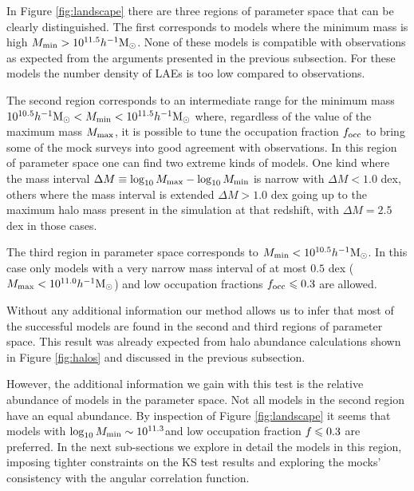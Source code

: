 \documentclass[usenatbib]{mn2e}
\newcommand{\hMsun}{{\ifmmode{h^{-1}{\rm
        {M_{\odot}}}}\else{$h^{-1}{\rm{M_{\odot}}}$}\fi}}
\begin{document}
{In Figure \ref{fig:landscape} there are three regions of parameter
space that can be clearly distinguished. The first corresponds to
models where the minimum mass is high $M_{\rm min}>
10^{11.5}\hMsun$. None of these models is compatible with observations
as expected from the arguments presented in the previous
subsection. For these models the number density of LAEs is too low
compared to observations.

 
The second region corresponds to an intermediate range for the minimum
mass $10^{10.5}\hMsun < M_{\rm min}< 10^{11.5}\hMsun$ where,
regardless of the value of the maximum mass $M_{\rm max}$, it is
possible to tune the occupation fraction $f_{\rm occ}$ to bring some
of the mock surveys into good agreement with observations. In this
region of parameter space one can find two extreme kinds of models.
One kind where the mass interval $\Delta M\equiv \log_{10} M_{\rm max}
- \log_{10}M_{\rm  min}$ is narrow with $\Delta M<1.0$ dex, others
where the mass interval is  extended $\Delta M>1.0$ dex going up to
the maximum halo mass present in the simulation at that redshift, with
$\Delta M = 2.5$ dex in those cases.
 
The third region in parameter space corresponds to $M_{\rm
  min}<10^{10.5}\hMsun$. In this case only models with a very narrow
mass interval of at most $0.5$ dex ($M_{\rm max}<10^{11.0}\hMsun$) and low
occupation fractions $f_{\rm occ}\leq 0.3$ are allowed. 

Without any additional information our method allows us to infer that
most of the successful models are found in the second and third regions of
parameter space. This result was already expected from halo
abundance calculations shown in Figure \ref{fig:halos} and discussed
in the previous subsection. 

However, the additional information we gain with this test is the
relative abundance of models in the parameter space. Not all 
models in the second region have an equal abundance. By inspection of
Figure \ref{fig:landscape} it seems that models with $\log_{10}M_{\rm
  min}\sim 10^{11.3}$\hMsun and low occupation fraction $f_{\rm}\leq 0.3$
are preferred.  In the next sub-sections we explore in detail the
models in this region, imposing tighter constraints on the KS test
results and exploring the mocks' consistency with the angular correlation
function.  

}
\end{document}
